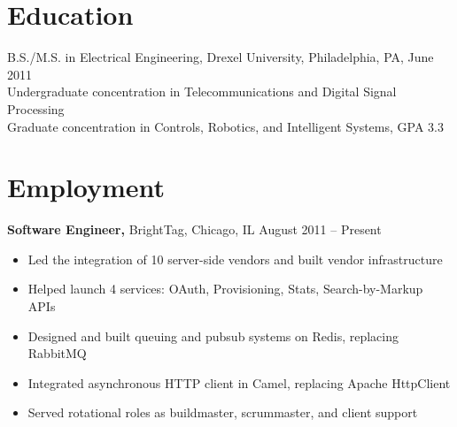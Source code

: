 \documentclass[margin]{res}
\begin{document}
 
 
 
\address{{\bf Present Address} \\ 4157 N Clarendon Ave \#404 \\ Chicago, IL 60613  \\
        (215) 501-7891 }
\address{{\bf Permanent Address} \\ 1726 Reyburn Creek Road \\ Malvern, AR 72104 \\
        (501) 337-8485 }

\begin{resume} 


\section{Education} 
B.S./M.S. in Electrical Engineering, Drexel University, Philadelphia, PA, June 2011 \\
Undergraduate concentration in Telecommunications and Digital Signal Processing \\
Graduate concentration in Controls, Robotics, and Intelligent Systems, GPA 3.3 

\section{Employment}
 {\bf Software Engineer,} BrightTag, Chicago, IL \hfill August 2011 -- Present
 \begin{itemize} \itemsep -2pt  %
  \item Led the integration of 10 server-side vendors and built vendor infrastructure
  \item Helped launch 4 services: OAuth, Provisioning, Stats, Search-by-Markup APIs
  \item Designed and built queuing and pubsub systems on Redis, replacing RabbitMQ
  \item Integrated asynchronous HTTP client in Camel, replacing Apache HttpClient
  \item Served rotational roles as buildmaster, scrummaster, and client support
 \end{itemize}


\end{resume}
\end{document}
